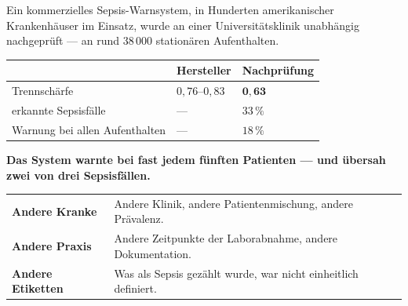 \begin{merksatz}
Ein kommerzielles Sepsis-Warnsystem, in Hunderten amerikanischer Krankenhäuser im Einsatz, wurde an einer Universitätsklinik unabhängig nachgeprüft --- an rund $38\,000$ stationären Aufenthalten.

\begin{center}
{\small
\renewcommand{\arraystretch}{1.5}
\begin{tabular}{@{}P{3.2cm}P{2.6cm}P{2.2cm}@{}}
\toprule
& \textbf{Hersteller} & \textbf{Nachprüfung}\\
\midrule
Trennschärfe & $0{,}76$--$0{,}83$ & $\mathbf{0{,}63}$\\
erkannte Sepsisfälle & --- & $33\,\%$\\
Warnung bei allen Aufenthalten & --- & $18\,\%$\\
\bottomrule
\end{tabular}}
\end{center}

\begin{center}
\begin{minipage}{0.9\textwidth}
\textbf{Das System warnte bei fast jedem fünften Patienten --- und übersah zwei von drei Sepsisfällen.}
\end{minipage}
\end{center}

\begin{center}
{\small
\renewcommand{\arraystretch}{1.5}
\begin{tabular}{@{}P{2.4cm}P{6.2cm}@{}}
\toprule
\textbf{Andere Kranke} & Andere Klinik, andere Patientenmischung, andere Prävalenz.\\
\textbf{Andere Praxis} & Andere Zeitpunkte der Laborabnahme, andere Dokumentation.\\
\textbf{Andere Etiketten} & Was als Sepsis gezählt wurde, war nicht einheitlich definiert.\\
\bottomrule
\end{tabular}}
\end{center}

\begin{center}
\begin{minipage}{0.88\textwidth}
\end{minipage}
\end{center}
\end{merksatz}

